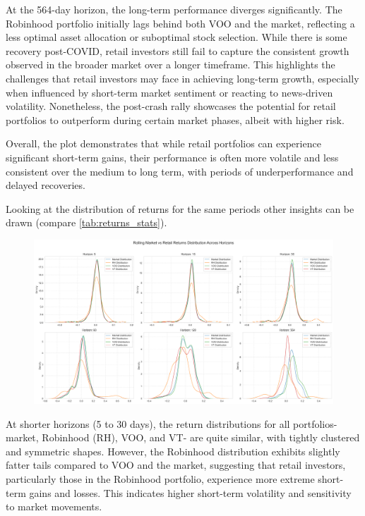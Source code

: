 At the 564-day horizon, the long-term performance diverges significantly. The Robinhood portfolio initially lags behind both VOO and the market, reflecting a less optimal asset allocation or suboptimal stock selection. While there is some recovery post-COVID, retail investors still fail to capture the consistent growth observed in the broader market over a longer timeframe. This highlights the challenges that retail investors may face in achieving long-term growth, especially when influenced by short-term market sentiment or reacting to news-driven volatility. Nonetheless, the post-crash rally showcases the potential for retail portfolios to outperform during certain market phases, albeit with higher risk.

Overall, the plot demonstrates that while retail portfolios can experience significant short-term gains, their performance is often more volatile and less consistent over the medium to long term, with periods of underperformance and delayed recoveries.

Looking at the distribution of returns for the same periods other insights can be drawn (compare \ref{tab:returns_stats}). 

\begin{figure}[h!]
    \centering
    \includegraphics[width=1\linewidth]{../images/distributions_comparison.png}
\end{figure}

At shorter horizons (5 to 30 days), the return distributions for all portfolios- market, Robinhood (RH), VOO, and VT- are quite similar, with tightly clustered and symmetric shapes. However, the Robinhood distribution exhibits slightly fatter tails compared to VOO and the market, suggesting that retail investors, particularly those in the Robinhood portfolio, experience more extreme short-term gains and losses. This indicates higher short-term volatility and sensitivity to market movements.

